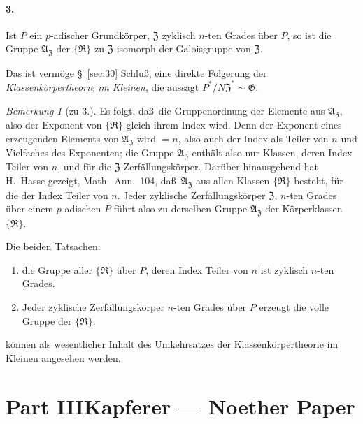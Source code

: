 \documentclass[12pt,a4paper]{article}
\theoremstyle{plain}
\theoremstyle{definition}
\theoremstyle{remark}
\newtheorem{bemerkung}{Bemerkung}[section]
\begin{document}
\subsection*{3.}

Ist $P$ ein $p$-adischer Grundk\"orper, $\mathfrak{Z}$ zyklisch $n$-ten Grades
\"uber $P$, so ist die Gruppe $\mathfrak{A}_{\mathfrak{Z}}$ der $\{\mathfrak{R}\}$ zu $\mathfrak{Z}$
isomorph der Galoisgruppe von $\mathfrak{Z}$.

Das ist verm\"oge \S~\ref{sec:30} Schlu\ss, eine direkte Folgerung der
\textit{Klassenk\"orpertheorie im Kleinen}, die aussagt
$P^{*}/N\mathfrak{Z}^{*} \sim \mathfrak{G}$.

\begin{bemerkung}[zu 3.]
Es folgt, da\ss\ die Gruppenordnung der Elemente aus
$\mathfrak{A}_{\mathfrak{Z}}$, also der Exponent von $\{\mathfrak{R}\}$ gleich ihrem
Index wird. Denn der Exponent eines erzeugenden Elements von
$\mathfrak{A}_{\mathfrak{Z}}$ wird $=n$, also auch der Index als Teiler von $n$
und Vielfaches des Exponenten; die Gruppe $\mathfrak{A}_{\mathfrak{Z}}$
enth\"alt also nur Klassen, deren Index Teiler von $n$, und f\"ur die
$\mathfrak{Z}$ Zerf\"allungsk\"orper. Dar\"uber hinausgehend hat H.\ Hasse
gezeigt, Math.\ Ann.\ 104, da\ss\ $\mathfrak{A}_{\mathfrak{Z}}$ aus allen Klassen
$\{\mathfrak{R}\}$ besteht, f\"ur die der Index Teiler von $n$. Jeder zyklische
Zerf\"allungsk\"orper $\mathfrak{Z}$, $n$-ten Grades \"uber einem $p$-adischen
$P$ f\"uhrt also zu derselben Gruppe $\mathfrak{A}_{\mathfrak{Z}}$ der
K\"orperklassen $\{\mathfrak{R}\}$.

Die beiden Tatsachen:
\begin{enumerate}
\item die Gruppe aller $\{\mathfrak{R}\}$ \"uber $P$, deren Index Teiler von $n$
ist zyklisch $n$-ten Grades.
\item Jeder zyklische Zerf\"allungsk\"orper $n$-ten Grades \"uber $P$
erzeugt die volle Gruppe der $\{\mathfrak{R}\}$.
\end{enumerate}
k\"onnen als wesentlicher Inhalt des Umkehrsatzes der
Klassenk\"orpertheorie im Kleinen angesehen werden.
\end{bemerkung}


\newpage
\part*{Part III\hspace{1em}Kapferer --- Noether Paper}
\end{document}
